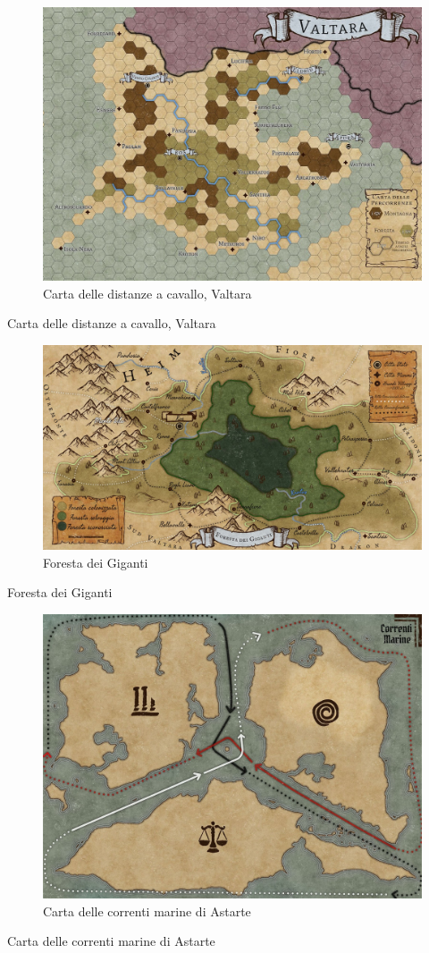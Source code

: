 \begin{figure}
\centering
\includegraphics{WhatsApp_Image_2023-08-26_at_21.29.18.jpeg}
\caption{Carta delle distanze a cavallo, Valtara}
\end{figure}

Carta delle distanze a cavallo, Valtara

\begin{figure}
\centering
\includegraphics{Foresta_2.jpg}
\caption{Foresta dei Giganti}
\end{figure}

Foresta dei Giganti

\begin{figure}
\centering
\includegraphics{carta_delle_correnti_marine.jpg}
\caption{Carta delle correnti marine di Astarte}
\end{figure}

Carta delle correnti marine di Astarte
